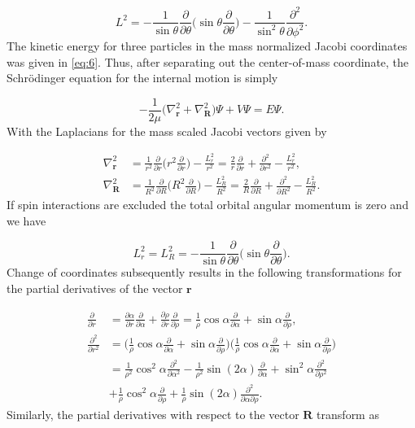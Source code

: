 \begin{equation}
L^{2} = -\frac{1}{\sin{\theta}}\frac{\partial}{\partial \theta} \bigg(\sin{\theta}\frac{\partial}{\partial \theta}\bigg) - \frac{1}{\sin^{2}{\theta}} \frac{\partial^{2}}{\partial \phi^{2}}.
\end{equation}
The kinetic energy for three particles in the mass normalized Jacobi coordinates was given in \eqref{eq:6}. Thus, after separating out the center-of-mass coordinate, the Schr{\"o}dinger equation for the internal motion is simply 

\begin{equation}
-\frac{1}{2\mu} \bigg(\nabla^{2}_{\mathbf{r}} + \nabla^{2}_{\mathbf{R}}\bigg) \Psi + V\Psi = E \Psi. 
\end{equation}
With the Laplacians for the mass scaled Jacobi vectors given by

\begin{align}
	\nabla^2_{\mathbf{r}} &= \frac{1}{r^2}\frac{\partial}{\partial r} \bigg( r^2 \frac{\partial}{\partial r} \bigg) - \frac{L^2_{r}}{r^2} = \frac{2}{r}\frac{\partial}{\partial r} + \frac{\partial^2}{\partial r^{2}} - \frac{L^{2}_{r}}{r^2},\\
	\nabla^2_{\mathbf{R}} &= \frac{1}{R^2}\frac{\partial}{\partial R} \bigg( R^2 \frac{\partial}{\partial R} \bigg) - \frac{L^2_{R}}{R^2} = \frac{2}{R}\frac{\partial}{\partial R} + \frac{\partial^2}{\partial R^{2}} - \frac{L^{2}_{R}}{R^2}.
\end{align}
If spin interactions are excluded the total orbital angular momentum is zero and we have 

\begin{equation}
L^{2}_r = L^{2}_{R} = -\frac{1}{\sin{\theta}} \frac{\partial}{\partial{\theta}} \bigg( \sin{\theta} \frac{\partial}{\partial{\theta}} \bigg).
\end{equation}
Change of coordinates subsequently results in the following transformations for the partial derivatives of the vector $\mathbf{r}$

\begin{align}
	\frac{\partial}{\partial r}        &= \frac{\partial\alpha}{\partial r} \frac{\partial}{\partial\alpha} +  \frac{\partial\rho}{\partial r} \frac{\partial}{\partial\rho} = \frac{1}{\rho}\cos{\alpha}\frac{\partial}{\partial \alpha} + \sin{\alpha}\frac{\partial}{\partial \rho}, \\
	\frac{\partial^2}{\partial r^2} &= \bigg( \frac{1}{\rho} \cos\alpha \frac{\partial}{\partial\alpha} + \sin\alpha \frac{\partial}{\partial\rho}\bigg) \bigg( \frac{1}{\rho} \cos\alpha \frac{\partial}{\partial\alpha} + \sin\alpha \frac{\partial}{\partial\rho}\bigg) \nonumber \\
	&= \frac{1}{\rho^2} \cos^2\alpha \frac{\partial^2}{\partial\alpha^{2}} - \frac{1}{\rho^2} \sin(2\alpha) \frac{\partial}{\partial\alpha} + \sin^2\alpha \frac{\partial^2}{\partial\rho^{2}} \nonumber \\
	&+ \frac{1}{\rho} \cos^2\alpha \frac{\partial}{\partial\rho} + \frac{1}{\rho} \sin(2\alpha) \frac{\partial^2}{\partial\alpha \partial\rho}.
\end{align}
Similarly, the partial derivatives with respect to the vector $\mathbf{R}$ transform as

